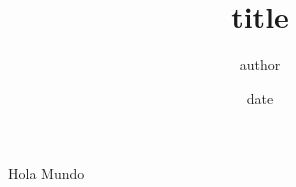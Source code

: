 \documentclass[12pt]{article}
\title{title}
\author{author}
\date{date}
\begin{document}
\maketitle


Hola Mundo

\end{document}

